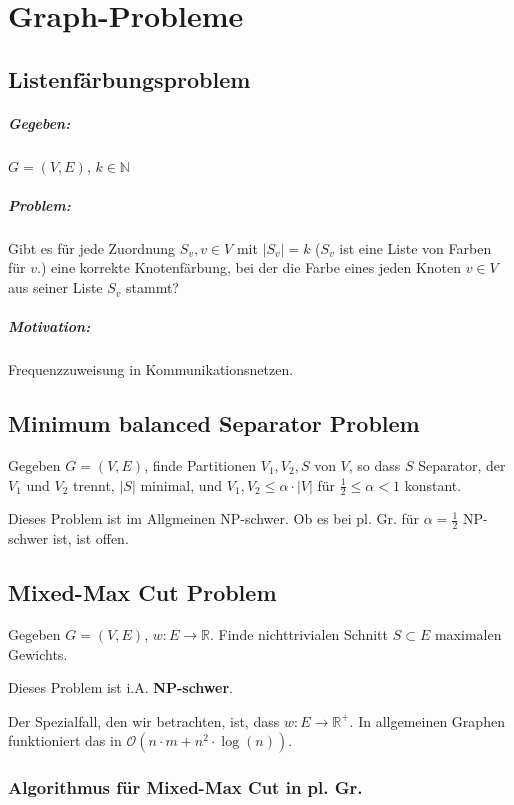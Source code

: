 \documentclass[a4paper,11pt]{report}
\begin{document}
\chapter{Graph-Probleme}
\section{Listenfärbungsproblem}
\paragraph{Gegeben:} $G = (V, E)$, $k \in \mathbb{N}$

\paragraph{Problem:} Gibt es für jede Zuordnung $S_v, v \in V$ mit $|S_v| = k$ ($S_v$ ist eine Liste von Farben für $v$.) eine korrekte Knotenfärbung, bei der die Farbe eines jeden Knoten $v \in V$ aus seiner Liste $S_v$ stammt?

\paragraph{Motivation:} Frequenzzuweisung in Kommunikationsnetzen.


\section{Minimum balanced Separator Problem}
Gegeben $G = (V, E)$, finde Partitionen $V_1, V_2, S$ von $V$, so dass $S$ Separator, der $V_1$ und $V_2$ trennt, $|S|$ minimal, und $V_1, V_2 \leq \alpha \cdot |V|$ für $\frac{1}{2} \leq \alpha < 1$ konstant.

Dieses Problem ist im Allgmeinen NP-schwer. Ob es bei pl. Gr. für $\alpha = \frac{1}{2}$ NP-schwer ist, ist offen.


\section{Mixed-Max Cut Problem}
Gegeben $G = (V, E)$, $w : E \rightarrow \mathbb{R}$. Finde nichttrivialen Schnitt $S \subset E$ maximalen Gewichts.

Dieses Problem ist i.A. {\bf NP-schwer}.

Der Spezialfall, den wir betrachten, ist, dass $w : E \rightarrow \mathbb{R}^+$. In allgemeinen Graphen funktioniert das in $\mathcal{O}(n \cdot m + n^2 \cdot \log(n))$.


\subsection{Algorithmus für Mixed-Max Cut in pl. Gr.}
\end{document}
